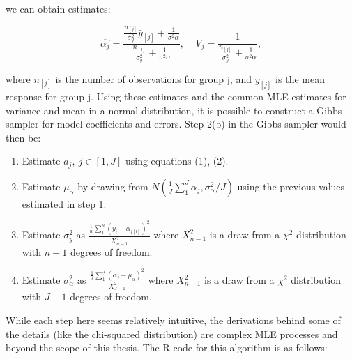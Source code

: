 \documentclass[12pt,twoside]{reedthesis}
\begin{document}
  we can obtain estimates:
  
  \begin{equation}
  \hat{\alpha_j} = \frac{\frac{n_{[j]}}{\sigma^2_y}\bar{y}_{[j]} + \frac{1}{\sigma^2{\alpha}}}{\frac{n_{[j]}}{\sigma^2_y} + \frac{1}{\sigma^2{\alpha}}},\ \ \ \ \  V_j = \frac{1}{\frac{n_{[j]}}{\sigma^2_y} + \frac{1}{\sigma^2{\alpha}}},
  \end{equation}
  
  where \(n_{[j]}\) is the number of observations for group j, and
  \(\bar{y}_{[j]}\) is the mean response for group j. Using these
  estimates and the common MLE estimates for variance and mean in a normal
  distribution, it is possible to construct a Gibbs sampler for model
  coefficients and errors. Step 2(b) in the Gibbs sampler would then be:
  
  \begin{enumerate}
    \item Estimate $a_j, \ j\in[1,J]$ using equations (1), (2).
    \item Estimate $\mu_{\alpha}$ by drawing from $N(\frac{1}{J}\sum_{1}^{J}\alpha_j, \sigma_{\alpha}^2/J)$ using the previous values estimated in step 1.
    \item Estimate $\sigma_y^2$ as $\frac{\frac{1}{n}\sum_{1}^{n}(y_i - \alpha_{j[i]})^2}{X_{n-1}^2}$ where $X_{n-1}^2$ is a draw from a $\chi^2$ distribution with $n-1$ degrees of freedom.
    \item Estimate $\sigma_{\alpha}^2$ as $\frac{\frac{1}{J}\sum_{1}^{J}(\alpha_j - \mu_{\alpha})^2}{X_{J-1}^2}$ where $X_{n-1}^2$ is a draw from a $\chi^2$ distribution with $J-1$ degrees of freedom.
  \end{enumerate}
  
  While each step here seems relatively intuitive, the derivations behind
  some of the details (like the chi-squared distribution) are complex MLE
  processes and beyond the scope of this thesis. The R code for this
  algorithm is as follows:
  
\end{document}

